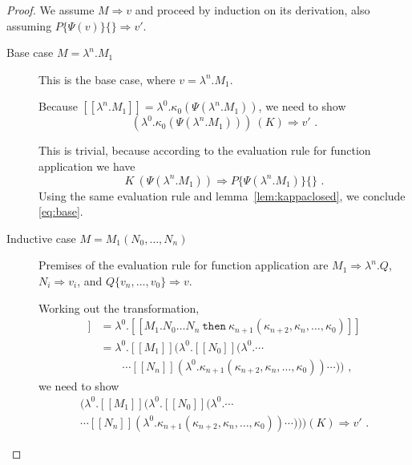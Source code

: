 \documentclass[a4paper,11pt,draft]{article}
\newcommand{\kw}[1]{\mathtt{#1}}
\begin{document}
\begin{proof}
We assume $M \Rightarrow v$ and proceed by induction on its derivation, also
assuming $P\{\Psi(v)\}\{\} \Rightarrow v'$.

\begin{description}
\item[\sffamily Base case $M = \lambda^{n}.M_{1}$]\hfill

  This is the base case, where $v = \lambda^{n}.M_{1}$.

  Because $[\![\lambda^{n}.M_{1}]\!] = \lambda^{0}.\kappa_{0}(\Psi(\lambda^{n}.M_{1}))$,
  we need to show
  \begin{equation}\label{eq:base}
    (\lambda^{0}.\kappa_{0}(\Psi(\lambda^{n}.M_{1}))) \: (K) \Rightarrow v' \text{ .}
  \end{equation}

  This is trivial, because according to the evaluation rule for
  function application we have
  \begin{equation*}
    K \: (\Psi(\lambda^{n}.M_{1})) \Rightarrow P\{\Psi(\lambda^{n}.M_{1})\}\{\} \text{ .}
  \end{equation*}
  Using the same evaluation rule and lemma~\ref{lem:kappaclosed}, we conclude
  \eqref{eq:base}.

\item[\sffamily Inductive case $M = M_{1}(N_{0}, \ldots, N_{n})$]\hfill

Premises of the evaluation rule for function application are
$M_{1} \Rightarrow \lambda^{n}.Q$, $N_{i} \Rightarrow v_{i}$,
and $Q\{v_{n}, \ldots, v_{0}\} \Rightarrow v$.

Working out the transformation,
\begin{align*}
  [\![M_{1}(N_{0}, \ldots, N_{n})]\!]
  &= \lambda^{0}.[\![M_{1}.N_{0} \ldots N_{n} \: \kw{then} \: \kappa_{n+1}(\kappa_{n+2}, \kappa_{n}, \ldots, \kappa_{0})]\!] \\
  &= \lambda^{0}.[\![M_{1}]\!](\lambda^{0}.[\![N_{0}]\!](\lambda^{0}. \cdots \\
  &  \qquad \cdots [\![N_{n}]\!](\lambda^{0}.\kappa_{n+1}(\kappa_{n+2}, \kappa_{n}, \ldots, \kappa_{0})) \cdots )) \text{ ,}
\end{align*}
we need to show
\begin{multline}\label{eq:faresult}
    (\lambda^{0}.[\![M_{1}]\!](\lambda^{0}.[\![N_{0}]\!](\lambda^{0}. \cdots \\
    \cdots [\![N_{n}]\!](\lambda^{0}.\kappa_{n+1}(\kappa_{n+2}, \kappa_{n}, \ldots, \kappa_{0})) \cdots )))(K) \Rightarrow v' \text{ .}
\end{multline}


\end{description}
\end{proof}
\end{document}
